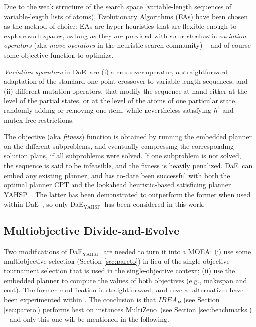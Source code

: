 \documentclass{article}
\def\DAE{{\sc DaE}}
\newcommand{\DAEYAHSP}{{\sc DaE$_{\text{YAHSP}}$}}
\def\YAHSP{{\sc YAHSP}}
\def\MULTIZENO{{\sc MultiZeno}}
\begin{document}
Due to the weak structure of the search space (variable-length sequences of variable-length lists of atoms), Evolutionary Algorithms (EAs) have been chosen as the method of choice: EAs are hyper-heuristics that are flexible enough to explore such spaces, as long as they are provided with some stochastic {\em variation operators} (aka {\em move operators} in the heuristic search community) -- and of course some objective function to optimize. 

{\em Variation operators} in \DAE\ are (i) a crossover operator, a straightforward adaptation of the standard one-point crossover to variable-length sequences; and (ii) different mutation operators, that modify the sequence at hand either at the level of the partial states, or at the level of the atoms of one particular state, randomly adding or removing one item, while nevertheless satisfying $h^1$ and mutex-free restrictions.

The objective (aka {\em fitness}) function is obtained by running the embedded planner on the different subproblems, and eventually compressing the corresponding solution plans, if all subproblems were solved. If one subproblem is not solved, the sequence is said to be infeasible, and the fitness is heavily penalized.
\DAE\ can embed any existing planner, and has to-date been successful with both the optimal planner CPT \cite{vidal:aaai04} and the lookahead heuristic-based satisficing planner \YAHSP\ \cite{Vidal2004}. The latter has been demonstrated to outperform the former when used within \DAE\ \cite{bibai-EvoCOP2010}, so only \DAEYAHSP\ has been considered in this work.

\subsection{Multiobjective Divide-and-Evolve}
\label{sec:pareto-multi-planning}

Two modifications of \DAEYAHSP\ are needed to turn it into a MOEA: (i) use some multiobjective selection (Section \ref{sec:pareto}) in lieu of the single-objective tournament selection that is used in the single-objective context; (ii) use the embedded planner to compute the values of both objectives (e.g., makespan and cost). The former modification is straightforward, and several alternatives have been experimented within \cite{nous-emo2013}. The conclusion is that $IBEA_H$ \cite{Zitzler2004} (see Section \ref{sec:pareto}) performs best on instances \MULTIZENO\ (see Section \ref{sec:benchmarks}) -- and only this one will be mentioned in the following.
\end{document}
